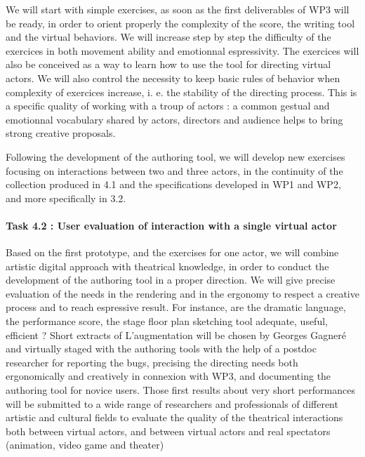 
We will start with simple exercises, as soon as the first deliverables of WP3 will be ready, in order to orient properly the complexity of the score, the writing tool and the virtual behaviors. We will increase step by step the difficulty of the exercices in both movement ability and emotionnal espressivity. The exercices will also be conceived as a way to learn how to use the tool for directing virtual actors. We will also control the necessity to keep basic rules of behavior when complexity of exercices increase, i. e. the stability of the directing process. This is a specific quality of working with a troup of actors : a common gestual and emotionnal vocabulary shared by actors, directors and audience helps to bring strong creative proposals.  

Following the development of the authoring tool, we will develop new exercises focusing on interactions between two and three actors, in the continuity of the collection produced in 4.1 and the specifications developed in WP1 and WP2, and more specifically in 3.2. 


\paragraph{Task 4.2 : User evaluation of interaction with a single virtual actor}

Based on the first prototype, and the exercises for one actor, we will combine artistic digital approach with theatrical knowledge, in order to conduct the development of the authoring tool in a proper direction. We will give precise evaluation of the needs in the rendering and in the ergonomy to respect a creative process and to reach espressive result. For instance, are the dramatic language, the performance score, the stage floor plan sketching tool adequate, useful, efficient ? Short extracts of L'augmentation will be chosen by Georges Gagner\'e and virtually staged with the authoring tools with the help of a postdoc researcher for reporting the bugs, precising the directing needs both ergonomically and creatively in connexion with WP3,  and documenting the authoring tool for novice   users.  Those first results about very short performances will be submitted to a wide range of researchers and professionals of different artistic and cultural fields to evaluate the quality of the theatrical interactions both between virtual actors, and between virtual actors and real spectators (animation, video game and theater)  


